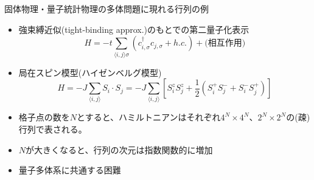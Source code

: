 \begin{frame}[t,fragile]{固体物理・量子統計物理の多体問題に現れる行列の例}
  \begin{itemize}
  \item 強束縛近似(tight-binding approx.)のもとでの第二量子化表示
    \[
    H = -t \sum_{\langle i,j \rangle \sigma} (c_{i,\sigma}^\dagger c_{j,\sigma} + h.c.) + \text{(相互作用)}
    \]
  \item 局在スピン模型(ハイゼンベルグ模型)
    \[
    H = -J\sum_{\langle i,j \rangle} S_i \cdot S_j
    = -J\sum_{\langle i,j \rangle} [S_i^z S_j^z +\frac{1}{2} (S_i^+ S_j^- + S_i^- S_j^+) ]
    \]
  \item 格子点の数を$N$とすると、ハミルトニアンはそれぞれ$4^N \times 4^N$、$2^N \times 2^N$の(疎)行列で表される。
  \item $N$が大きくなると、行列の次元は指数関数的に増加
  \item 量子多体系に共通する困難
  \end{itemize}
\end{frame}
